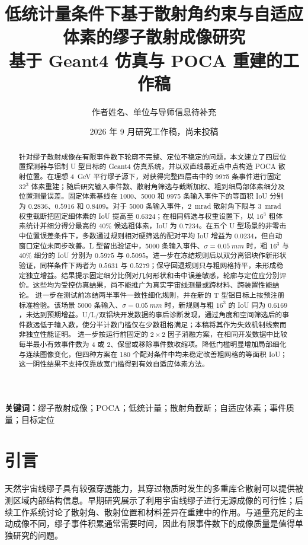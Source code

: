\documentclass[UTF8,fontset=none,zihao=-4,a4paper]{ctexart}
\title{低统计量条件下基于散射角约束与自适应体素的缪子散射成像研究\\\large 基于 Geant4 仿真与 POCA 重建的工作稿}
\author{作者姓名、单位与导师信息待补充}
\date{2026 年 9 月\quad 研究工作稿，尚未投稿}
\begin{document}
\maketitle
\begin{abstract}
针对缪子散射成像在有限事件数下轮廓不完整、定位不稳定的问题，本文建立了四层位置探测器与铝制 U 型目标的 Geant4 仿真系统，并以双直线最近点中点构造 POCA 散射位置。在理想 \SI{4}{GeV} 平行缪子源下，对获得完整四层击中的 \num{9975} 条事件进行固定 $32^3$ 体素重建；随后研究输入事件数、散射角筛选与截断加权、粗到细局部体素细分及位置测量误差。固定体素基线在 \num{1000}、\num{5000} 和 \num{9975} 条输入事件下的等面积 IoU 分别为 $0.2836$、$0.5916$ 和 $0.8409$。对于 \num{5000} 条输入事件，\SI{2}{mrad} 散射角下限与 \SI{3}{mrad} 权重截断把固定细体素的 IoU 提高至 $0.6324$；在相同筛选与权重设置下，以 $16^3$ 粗体素统计并细分得分最高的 $40\%$ 候选粗体素，IoU 为 $0.7234$。在五个 U 型场景的非零击中位置误差条件下，多数通过规则相对硬筛选的配对平均 IoU 增益为 $0.0234$，但自动窗口定位未同步改善。L 型留出验证中，\num{5000} 条输入事件、$\sigma=\SI{0.05}{mm}$ 时，粗 $16^3$ 与 $40\%$ 细分的 IoU 分别为 $0.5975$ 与 $0.5095$。进一步在冻结规则后以双分离铝块作新形状验证，同样条件下两者为 $0.5631$ 与 $0.5279$；保守回退规则只与粗网格持平，未形成稳定独立增益。结果提示固定细分比例对几何形状和击中误差敏感，轮廓与定位应分别评价。这些均为受控仿真结果，尚不能推广为真实宇宙线测量或跨材料、跨装置性能结论。
进一步在测试前冻结两半事件一致性细化规则，并在新的 T 型铝目标上按预注册标准检验。该场景 \num{5000} 条输入、$\sigma=\SI{0.05}{mm}$ 时，新规则与粗 $16^3$ 的 IoU 同为 $0.6169$，未达到预期增益。U/L/双铝块开发数据的事后诊断发现，通过角度和空间筛选后的事件数远低于输入数，使分半计数门槛仅在少数粗格满足；本稿将其作为失效机制线索而非独立性能证明。
进一步按运行前固定的 $2\times2$ 因子消融方案，在相同开发数据中比较每半最小有效事件数为 4 或 2、保留或移除事件数收缩项。降低门槛明显增加局部细化与连续图像变化，但四种方案在 180 个配对条件中均未稳定改善粗网格的等面积 IoU；这一阴性结果不支持仅靠放宽门槛得到有效自适应体素方法。
\end{abstract}

\noindent\textbf{关键词：}缪子散射成像；POCA；低统计量；散射角截断；自适应体素；事件质量；目标定位

\section{引言}
天然宇宙线缪子具有较强穿透能力，其穿过物质时发生的多重库仑散射可以提供被测区域内部结构信息。早期研究展示了利用宇宙线缪子进行无源成像的可行性\cite{borozdin2003}；后续工作系统讨论了散射角、散射位置和材料差异在重建中的作用\cite{schultz2004}。与通量充足的主动成像不同，缪子事件积累通常需要时间，因此有限事件数下的成像质量是值得单独研究的问题。
\end{document}
